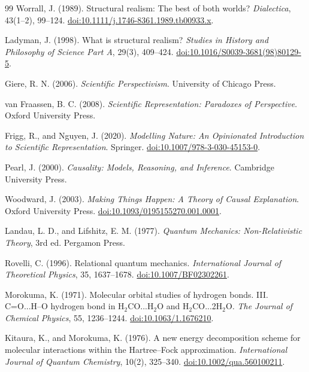 \documentclass[11pt,a4paper]{article}
\begin{document}
\begin{thebibliography}{99}
Worrall, J. (1989). Structural realism: The best of both worlds? \emph{Dialectica}, 43(1--2), 99--124. \href{https://doi.org/10.1111/j.1746-8361.1989.tb00933.x}{doi:10.1111/j.1746-8361.1989.tb00933.x}.

Ladyman, J. (1998). What is structural realism? \emph{Studies in History and Philosophy of Science Part A}, 29(3), 409--424. \href{https://doi.org/10.1016/S0039-3681(98)80129-5}{doi:10.1016/S0039-3681(98)80129-5}.

Giere, R. N. (2006). \emph{Scientific Perspectivism}. University of Chicago Press.

van Fraassen, B. C. (2008). \emph{Scientific Representation: Paradoxes of Perspective}. Oxford University Press.

Frigg, R., and Nguyen, J. (2020). \emph{Modelling Nature: An Opinionated Introduction to Scientific Representation}. Springer. \href{https://doi.org/10.1007/978-3-030-45153-0}{doi:10.1007/978-3-030-45153-0}.

Pearl, J. (2000). \emph{Causality: Models, Reasoning, and Inference}. Cambridge University Press.

Woodward, J. (2003). \emph{Making Things Happen: A Theory of Causal Explanation}. Oxford University Press. \href{https://doi.org/10.1093/0195155270.001.0001}{doi:10.1093/0195155270.001.0001}.

Landau, L. D., and Lifshitz, E. M. (1977). \emph{Quantum Mechanics: Non-Relativistic Theory}, 3rd ed. Pergamon Press.

Rovelli, C. (1996). Relational quantum mechanics. \emph{International Journal of Theoretical Physics}, 35, 1637--1678. \href{https://doi.org/10.1007/BF02302261}{doi:10.1007/BF02302261}.

Morokuma, K. (1971). Molecular orbital studies of hydrogen bonds. III. C=O...H--O hydrogen bond in H$_2$CO...H$_2$O and H$_2$CO...2H$_2$O. \emph{The Journal of Chemical Physics}, 55, 1236--1244. \href{https://doi.org/10.1063/1.1676210}{doi:10.1063/1.1676210}.

Kitaura, K., and Morokuma, K. (1976). A new energy decomposition scheme for molecular interactions within the Hartree--Fock approximation. \emph{International Journal of Quantum Chemistry}, 10(2), 325--340. \href{https://doi.org/10.1002/qua.560100211}{doi:10.1002/qua.560100211}.


\end{thebibliography}
\end{document}
